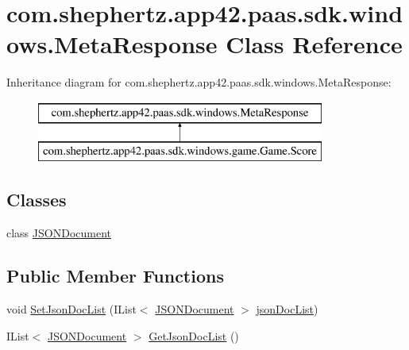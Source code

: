 \hypertarget{classcom_1_1shephertz_1_1app42_1_1paas_1_1sdk_1_1windows_1_1_meta_response}{\section{com.\+shephertz.\+app42.\+paas.\+sdk.\+windows.\+Meta\+Response Class Reference}
\label{classcom_1_1shephertz_1_1app42_1_1paas_1_1sdk_1_1windows_1_1_meta_response}
}


 


Inheritance diagram for com.\+shephertz.\+app42.\+paas.\+sdk.\+windows.\+Meta\+Response\+:\begin{figure}[H]
\begin{center}
\leavevmode
\includegraphics[height=2.000000cm]{classcom_1_1shephertz_1_1app42_1_1paas_1_1sdk_1_1windows_1_1_meta_response}
\end{center}
\end{figure}
\subsection*{Classes}
\begin{DoxyCompactItemize}
\item 
class \hyperlink{classcom_1_1shephertz_1_1app42_1_1paas_1_1sdk_1_1windows_1_1_meta_response_1_1_j_s_o_n_document}{J\+S\+O\+N\+Document}
\end{DoxyCompactItemize}
\subsection*{Public Member Functions}
\begin{DoxyCompactItemize}
\item 
void \hyperlink{classcom_1_1shephertz_1_1app42_1_1paas_1_1sdk_1_1windows_1_1_meta_response_aaca3bfc108ae6e45c8606d8e3667fab7}{Set\+Json\+Doc\+List} (I\+List$<$ \hyperlink{classcom_1_1shephertz_1_1app42_1_1paas_1_1sdk_1_1windows_1_1_meta_response_1_1_j_s_o_n_document}{J\+S\+O\+N\+Document} $>$ \hyperlink{classcom_1_1shephertz_1_1app42_1_1paas_1_1sdk_1_1windows_1_1_meta_response_ae24a3999d5cf00ec9b313aa1f7a265c9}{json\+Doc\+List})
\item 
I\+List$<$ \hyperlink{classcom_1_1shephertz_1_1app42_1_1paas_1_1sdk_1_1windows_1_1_meta_response_1_1_j_s_o_n_document}{J\+S\+O\+N\+Document} $>$ \hyperlink{classcom_1_1shephertz_1_1app42_1_1paas_1_1sdk_1_1windows_1_1_meta_response_a883f8d5616550c3213d640220a62cbd8}{Get\+Json\+Doc\+List} ()
\end{DoxyCompactItemize}
